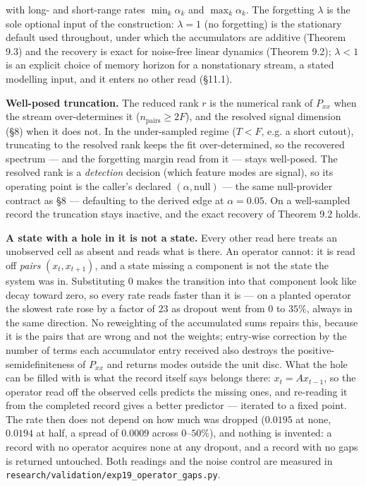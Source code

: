 \documentclass[10pt,letterpaper,twocolumn]{article}
\begin{document}
with long- and short-range rates \(\min_k\alpha_k\) and \(\max_k\alpha_k\). The forgetting \(\lambda\) is the sole optional input of the construction: \(\lambda=1\) (no forgetting) is the stationary default used throughout, under which the accumulators are additive (Theorem 9.3) and the recovery is exact for noise-free linear dynamics (Theorem 9.2); \(\lambda<1\) is an explicit choice of memory horizon for a nonstationary stream, a stated modelling input, and it enters no other read (§11.1).

\textbf{Well-posed truncation.} The reduced rank \(r\) is the numerical rank of \(P_{xx}\) when the stream over-determines it (\(n_{\mathrm{pairs}}\ge 2F\)), and the resolved signal dimension (§8) when it does not. In the under-sampled regime (\(T<F\), e.g. a short cutout), truncating to the resolved rank keeps the fit over-determined, so the recovered spectrum --- and the forgetting margin read from it --- stays well-posed. The resolved rank is a \emph{detection} decision (which feature modes are signal), so its operating point is the caller's declared \((\alpha,\text{null})\) --- the same null-provider contract as §8 --- defaulting to the derived edge at \(\alpha=0.05\). On a well-sampled record the truncation stays inactive, and the exact recovery of Theorem 9.2 holds.

\textbf{A state with a hole in it is not a state.} Every other read here treats an unobserved cell as absent and reads what is there. An operator cannot: it is read off \emph{pairs} \((x_t,x_{t+1})\), and a state missing a component is not the state the system was in. Substituting \(0\) makes the transition into that component look like decay toward zero, so every rate reads faster than it is --- on a planted operator the slowest rate rose by a factor of \(23\) as dropout went from \(0\) to \(35\%\), always in the same direction. No reweighting of the accumulated sums repairs this, because it is the pairs that are wrong and not the weights; entry-wise correction by the number of terms each accumulator entry received also destroys the positive\allowbreak{}-\allowbreak{}semidefi\allowbreak{}niteness of \(P_{xx}\) and returns modes outside the unit disc. What the hole can be filled with is what the record itself says belongs there: \(x_t=Ax_{t-1}\), so the operator read off the observed cells predicts the missing ones, and re-reading it from the completed record gives a better predictor --- iterated to a fixed point. The rate then does not depend on how much was dropped (\(0.0195\) at none, \(0.0194\) at half, a spread of \(0.0009\) across \(0\)--\(50\%\)), and nothing is invented: a record with no operator acquires none at any dropout, and a record with no gaps is returned untouched. Both readings and the noise control are measured in \texttt{research/\allowbreak{}validation/\allowbreak{}exp19\_\allowbreak{}operator\_\allowbreak{}gaps.\allowbreak{}py}.
\end{document}

